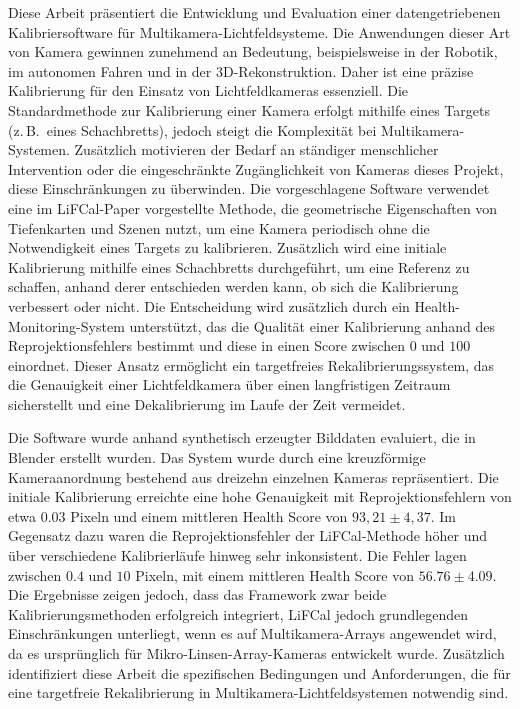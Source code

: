 \documentclass[12pt]{scrartcl}
\begin{document}
Diese Arbeit präsentiert die Entwicklung und Evaluation einer datengetriebenen Kalibriersoftware für Multikamera-Lichtfeldsysteme. Die Anwendungen dieser Art von Kamera gewinnen zunehmend an Bedeutung, beispielsweise in der Robotik, im autonomen Fahren und in der 3D-Rekonstruktion. Daher ist eine präzise Kalibrierung für den Einsatz von Lichtfeldkameras essenziell. Die Standardmethode zur Kalibrierung einer Kamera erfolgt mithilfe eines Targets (z.\,B.\ eines Schachbretts), jedoch steigt die Komplexität bei Multikamera-Systemen. Zusätzlich motivieren der Bedarf an ständiger menschlicher Intervention oder die eingeschränkte Zugänglichkeit von Kameras dieses Projekt, diese Einschränkungen zu überwinden. Die vorgeschlagene Software verwendet eine im LiFCal-Paper vorgestellte Methode, die geometrische Eigenschaften von Tiefenkarten und Szenen nutzt, um eine Kamera periodisch ohne die Notwendigkeit eines Targets zu kalibrieren. Zusätzlich wird eine initiale Kalibrierung mithilfe eines Schachbretts durchgeführt, um eine Referenz zu schaffen, anhand derer entschieden werden kann, ob sich die Kalibrierung verbessert oder nicht. Die Entscheidung wird zusätzlich durch ein Health-Monitoring-System unterstützt, das die Qualität einer Kalibrierung anhand des Reprojektionsfehlers bestimmt und diese in einen Score zwischen $0$ und $100$ einordnet. Dieser Ansatz ermöglicht ein targetfreies Rekalibrierungssystem, das die Genauigkeit einer Lichtfeldkamera über einen langfristigen Zeitraum sicherstellt und eine Dekalibrierung im Laufe der Zeit vermeidet.
\newline

Die Software wurde anhand synthetisch erzeugter Bilddaten evaluiert, die in Blender erstellt wurden. Das System wurde durch eine kreuzförmige Kameraanordnung bestehend aus dreizehn einzelnen Kameras repräsentiert. Die initiale Kalibrierung erreichte eine hohe Genauigkeit mit Reprojektionsfehlern von etwa $0.03$ Pixeln und einem mittleren Health Score von $93,21 \pm 4,37$. Im Gegensatz dazu waren die Reprojektionsfehler der LiFCal-Methode höher und über verschiedene Kalibrierläufe hinweg sehr inkonsistent. Die Fehler lagen zwischen $0.4$ und $10$ Pixeln, mit einem mittleren Health Score von $56.76 \pm 4.09$. Die Ergebnisse zeigen jedoch, dass das Framework zwar beide Kalibrierungsmethoden erfolgreich integriert, LiFCal jedoch grundlegenden Einschränkungen unterliegt, wenn es auf Multikamera-Arrays angewendet wird, da es ursprünglich für Mikro-Linsen-Array-Kameras entwickelt wurde. Zusätzlich identifiziert diese Arbeit die spezifischen Bedingungen und Anforderungen, die für eine targetfreie Rekalibrierung in Multikamera-Lichtfeldsystemen notwendig sind.
\end{document}

